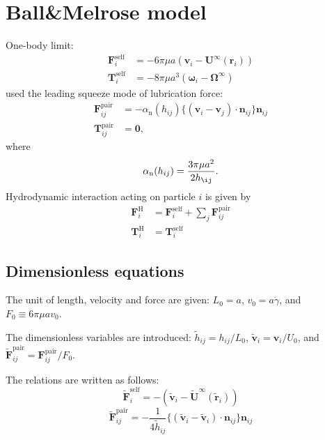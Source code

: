 \documentclass[12pt]{article}
\begin{document}
\newpage

\section{Ball\&Melrose model}

One-body limit:
\begin{align}
 \bm{F}_i^{\mathrm{self}} &= 
-6 \pi \mu a ( \bm{v}_i - \bm{U}^{\infty} (\bm{r}_i) ) \\
 \bm{T}_i^{\mathrm{self}} &= 
-8 \pi \mu a^3 ( \bm{\omega}_i - \bm{\Omega}^{\infty})
\end{align}
%
\citet{Melrose_2004a} used
the leading squeeze mode of lubrication force:
\begin{align}
 \bm{F}_{ij}^{\mathrm{pair}}
&=
- \alpha_{\mathrm{n}}(h_{ij})
\bigl\{
(\bm{v}_i - \bm{v}_j)
\cdot \bm{n}_{ij}
\bigr\}
\bm{n}_{ij} \\
 \bm{T}_{ij}^{\mathrm{pair}}
&=
\bm{0},
\end{align}
where
\begin{equation}
 \alpha_{\mathrm{n}}(h_{ij}) = 
\frac{3 \pi \mu a^2}{2 h_{\ij}}.
\end{equation}
Hydrodynamic interaction acting on particle $i$
is given by
\begin{align}
\bm{F}_i^{\mathrm{H}}
&=
\bm{F}_i^{\mathrm{self}}
+
\sum_j
\bm{F}_{ij}^{\mathrm{pair}} \\
\bm{T}_i^{\mathrm{H}}
&=
\bm{T}_i^{\mathrm{self}}
\end{align}


\subsection*{Dimensionless equations}

The unit of length, velocity and force 
are given:
$L_0 = a$,  $v_0 = a \dot{\gamma}$, and $F_0 \equiv 6 \pi \mu a v_0$.

The dimensionless variables are introduced:
$\tilde{h}_{ij} = h_{ij} / L_0$,
$\tilde{\bm{v}}_i = \bm{v}_i / U_0$,
and $\tilde{\bm{F}}_{ij}^{\mathrm{pair}} = \bm{F}_{ij}^{\mathrm{pair}} / F_0$.

The relations are written as follows:
\begin{equation}
 \tilde{\bm{F}}_i^{\mathrm{self}} = 
-( \tilde{\bm{v}}_i - 
\tilde{\bm{U}}^{\infty} 
(\tilde{\bm{r}}_i) )
\end{equation}
\begin{equation}
 \tilde{\bm{F}}_{ij}^{\mathrm{pair}}
= 
- \frac{1}{4 \tilde{h}_{ij}}
\bigl\{
(\tilde{\bm{v}}_i-
\tilde{\bm{v}}_i)\cdot
\bm{n}_{ij}
\bigr\}\bm{n}_{ij}
\end{equation}
\end{document}
